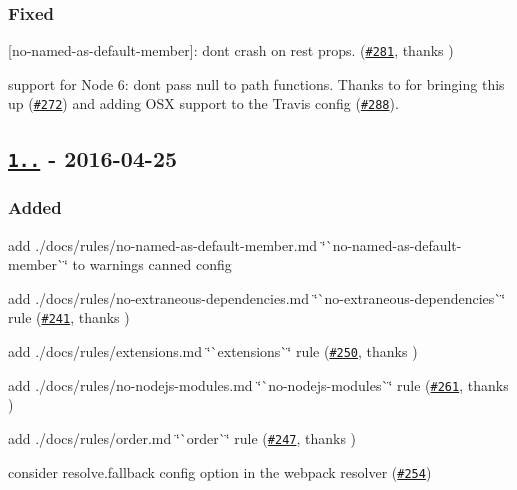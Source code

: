 \subsubsection*{Fixed}


\begin{DoxyItemize}
\item \mbox{[}{\ttfamily no-\/named-\/as-\/default-\/member}\mbox{]}\+: don\textquotesingle{}t crash on rest props. (\href{https://github.com/benmosher/eslint-plugin-import/issues/281}{\tt \#281}, thanks \href{https://github.com/SimenB}{\tt })
\item support for Node 6\+: don\textquotesingle{}t pass {\ttfamily null} to {\ttfamily path} functions. Thanks to \href{https://github.com/strawbrary}{\tt } for bringing this up (\href{https://github.com/benmosher/eslint-plugin-import/issues/272}{\tt \#272}) and adding O\+SX support to the Travis config (\href{https://github.com/benmosher/eslint-plugin-import/pull/288}{\tt \#288}).
\end{DoxyItemize}

\subsection*{\href{https://github.com/benmosher/eslint-plugin-import/compare/v1.5.0...1.6.0}{\tt 1..} -\/ 2016-\/04-\/25}

\subsubsection*{Added}


\begin{DoxyItemize}
\item add ./docs/rules/no-\/named-\/as-\/default-\/member.md \char`\"{}\`{}no-\/named-\/as-\/default-\/member\`{}\char`\"{} to {\ttfamily warnings} canned config
\item add ./docs/rules/no-\/extraneous-\/dependencies.md \char`\"{}\`{}no-\/extraneous-\/dependencies\`{}\char`\"{} rule (\href{https://github.com/benmosher/eslint-plugin-import/pull/241}{\tt \#241}, thanks \href{https://github.com/jfmengels}{\tt })
\item add ./docs/rules/extensions.md \char`\"{}\`{}extensions\`{}\char`\"{} rule (\href{https://github.com/benmosher/eslint-plugin-import/pull/250}{\tt \#250}, thanks \href{https://github.com/lo1tuma}{\tt })
\item add ./docs/rules/no-\/nodejs-\/modules.md \char`\"{}\`{}no-\/nodejs-\/modules\`{}\char`\"{} rule (\href{https://github.com/benmosher/eslint-plugin-import/pull/261}{\tt \#261}, thanks \href{https://github.com/jfmengels}{\tt })
\item add ./docs/rules/order.md \char`\"{}\`{}order\`{}\char`\"{} rule (\href{https://github.com/benmosher/eslint-plugin-import/pull/247}{\tt \#247}, thanks \href{https://github.com/jfmengels}{\tt })
\item consider {\ttfamily resolve.\+fallback} config option in the webpack resolver (\href{https://github.com/benmosher/eslint-plugin-import/pull/254}{\tt \#254})
\end{DoxyItemize}

